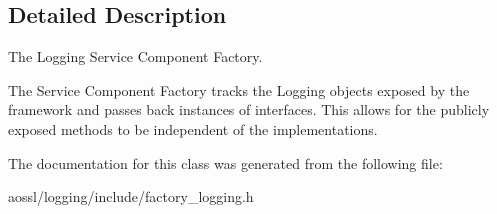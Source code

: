 \subsection{Detailed Description}
The Logging Service Component Factory. 

The Service Component Factory tracks the Logging objects exposed by the framework and passes back instances of interfaces. This allows for the publicly exposed methods to be independent of the implementations. 

The documentation for this class was generated from the following file\+:\begin{DoxyCompactItemize}
\item 
aossl/logging/include/factory\+\_\+logging.\+h\end{DoxyCompactItemize}
